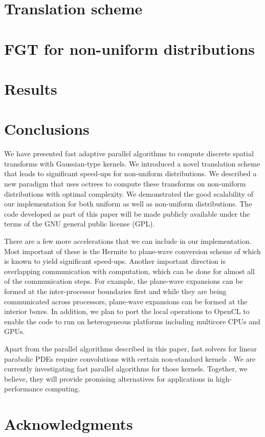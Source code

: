 \documentclass[conference]{IEEEtran}
\begin{document}
\section{Translation scheme} 
\label{sc:sweep}


\section{FGT for non-uniform distributions} 
\label{sc:nonuniform}




\section{Results}
\label{sc:results}


\section{Conclusions}
\label{sc:conclusions}
We have presented fast adaptive parallel algorithms to compute discrete spatial transforms with Gaussian-type kernels.
We introduced a novel translation scheme that leads to significant speed-ups for non-uniform distributions. We described a
 new paradigm that uses octrees to compute these transforms on non-uniform distributions with optimal complexity. 
 We demonstrated the good scalability of our implementation for both uniform as well as non-uniform distributions. The
 code developed as part of this paper will be made publicly available under the terms of the GNU general public license (GPL). 
 
There are a few more accelerations that we can include in our implementation. Most important of these is the Hermite to 
plane-wave conversion scheme of \cite{fggt} which is known to yield significant speed-ups. Another important direction
 is overlapping communication with computation, which can be done for almost all of the communication steps. For example, 
 the plane-wave expansions can be formed at the inter-processor boundaries first and while they are being communicated 
 across processors, plane-wave expansions can be formed at the interior boxes. In addition, we plan to port
 the local operations to OpenCL \cite{opencl} to enable the code to run on heterogeneous platforms including multicore CPUs and GPUs.

Apart from the parallel algorithms described in this paper, fast solvers for linear parabolic PDEs 
require convolutions with certain non-standard kernels \cite{li09, skv09}. We are currently investigating fast 
parallel algorithms for those kernels. Together, we believe, they will provide promising alternatives 
for applications in high-performance computing. 

\section*{Acknowledgments}


\balance



\end{document}
